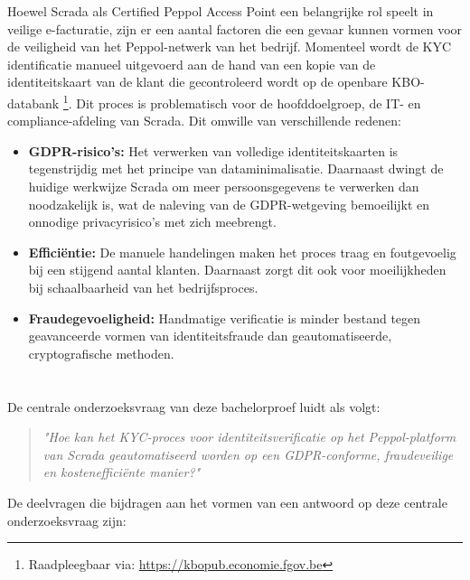 Hoewel Scrada als Certified Peppol Access Point een belangrijke rol speelt in veilige e-facturatie, zijn er een aantal factoren die een gevaar kunnen vormen voor de veiligheid van het Peppol-netwerk van het bedrijf.
Momenteel wordt de KYC identificatie manueel uitgevoerd aan de hand van een kopie van de identiteitskaart van de klant die gecontroleerd wordt op de openbare KBO-databank \footnote{Raadpleegbaar via: \url{https://kbopub.economie.fgov.be}}. Dit proces is problematisch voor de hoofddoelgroep, de IT- en compliance-afdeling van Scrada. 
Dit omwille van verschillende redenen:
\begin{itemize}
  \item \textbf{GDPR-risico's:} Het verwerken van volledige identiteitskaarten is tegenstrijdig met het principe van dataminimalisatie. 
  Daarnaast dwingt de huidige werkwijze Scrada om meer persoonsgegevens te verwerken dan noodzakelijk is, wat de naleving van de GDPR-wetgeving bemoeilijkt en onnodige privacyrisico's met zich meebrengt.
  \item \textbf{Efficiëntie:} De manuele handelingen maken het proces traag en foutgevoelig bij een stijgend aantal klanten. Daarnaast zorgt dit ook voor moeilijkheden bij schaalbaarheid van het bedrijfsproces.
  \item \textbf{Fraudegevoeligheid:} Handmatige verificatie is minder bestand tegen geavanceerde vormen van identiteitsfraude dan geautomatiseerde, cryptografische methoden.
\end{itemize}

\section{}%
\label{sec:onderzoeksvraag}

De centrale onderzoeksvraag van deze bachelorproef luidt als volgt:
\begin{quote}
    \textit{"Hoe kan het KYC-proces voor identiteitsverificatie op het Peppol-platform van Scrada geautomatiseerd worden op een GDPR-conforme, fraudeveilige en kostenefficiënte manier?"}
\end{quote}

De deelvragen die bijdragen aan het vormen van een antwoord op deze centrale onderzoeksvraag zijn:
